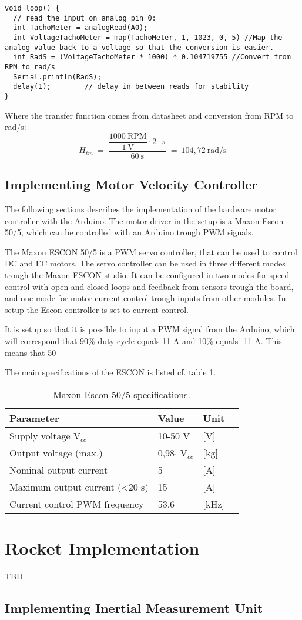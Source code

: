 \begin{lstlisting}
void loop() {
  // read the input on analog pin 0:
  int TachoMeter = analogRead(A0);
  int VoltageTachoMeter = map(TachoMeter, 1, 1023, 0, 5) //Map the analog value back to a voltage so that the conversion is easier.
  int RadS = (VoltageTachoMeter * 1000) * 0.104719755 //Convert from RPM to rad/s
  Serial.println(RadS);
  delay(1);        // delay in between reads for stability
}
\end{lstlisting}  

Where the transfer function comes from datasheet and conversion from RPM to rad/s:
\begin{equation}
H_{tm}\ =\ \dfrac{\dfrac{1000\ \text{RPM}}{1\ \text{V}} \cdot 2 \cdot \pi}{60\ \text{s}}\ =\ 104,72\ \text{rad/s}
\end{equation}

\subsection{Implementing Motor Velocity Controller}
The following sections describes the implementation of the hardware motor controller with the Arduino. The motor driver in the setup is a Maxon Escon 50/5, which can be controlled with an Arduino trough PWM signals. 

The Maxon ESCON 50/5 is a PWM servo controller, that can be used to control DC and EC motors. The servo controller can be used in three different modes trough the Maxon ESCON studio. It can be configured in two modes for speed control with open and closed loops and feedback from sensors trough the board, and one mode for motor current control trough inputs from other modules. In setup the Escon controller is set to current control.

It is setup so that it is possible to input a PWM signal from the Arduino, which will correspond that 90\% duty cycle equals 11 A and 10\% equals -11 A. This means that 50

The main specifications of the ESCON is listed cf. table \ref{MaxonSpecifications}.

\begin{table}[htbp]
	\centering
	\begin{tabular}{llll}
	\hline
	Parameter & Value & Unit \\ \hline
	Supply voltage V$_{cc}$& 10-50 V & {[}V{]} \\
	Output voltage (max.) & 0,98$\cdot$ V$_{cc}$& {[}kg{]} \\
	Nominal output current & 5 & {[}A{]} \\
	Maximum output current (<20 s) & 15 & {[}A{]}\\
	Current control PWM frequency & 53,6 & {[}kHz{]}
	\end{tabular}
\caption{Maxon Escon 50/5 specifications.}
\label{MaxonSpecifications}
\end{table}



\section{Rocket Implementation}
TBD

\subsection{Implementing Inertial Measurement Unit}